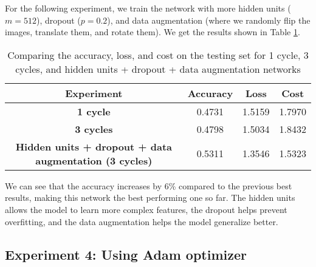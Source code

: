 \documentclass{article}
\begin{document}




For the following experiment, we train the network with more hidden units ($m = 512$), dropout ($p = 0.2$), and data augmentation (where we randomly flip the images, translate them, and rotate them). We get the results shown in Table \ref{tab:experiment3}.

\begin{table}[h!]
    \centering
    \begin{tabular}{|c|c|c|c|}
    \hline
    \textbf{Experiment} & \textbf{Accuracy} & \textbf{Loss} & \textbf{Cost} \\
    \hline
    \textbf{1 cycle} & 0.4731 & 1.5159 & 1.7970 \\
    \textbf{3 cycles} & 0.4798 & 1.5034 & 1.8432 \\
    \textbf{Hidden units + dropout + data augmentation (3 cycles)} & 0.5311 & 1.3546 & 1.5323 \\
    \hline
    \end{tabular}
    \caption{Comparing the accuracy, loss, and cost on the testing set for 1 cycle, 3 cycles, and hidden units + dropout + data augmentation networks}
    \label{tab:experiment3}
\end{table}

We can see that the accuracy increases by 6\% compared to the previous best results, making this network the best performing one so far. The hidden units allows the model to learn more complex features, the dropout helps prevent overfitting, and the data augmentation helps the model generalize better.


\subsection{Experiment 4: Using Adam optimizer}
\end{document}
